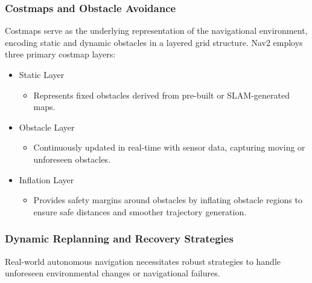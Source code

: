 \documentclass[english,project]{buwthesis}
\begin{document}
\subsubsection{Costmaps and Obstacle Avoidance}
Costmaps serve as the underlying representation of the navigational environment, encoding static and dynamic obstacles in a layered grid structure. Nav2 employs three primary costmap layers:
\begin{itemize}
    \item Static Layer
    \begin{itemize}
        \item Represents fixed obstacles derived from pre-built or SLAM-generated maps.
    \end{itemize}

    \item Obstacle Layer
    \begin{itemize}
        \item Continuously updated in real-time with sensor data, capturing moving or unforeseen obstacles.
    \end{itemize}

    \item Inflation Layer
    \begin{itemize}
        \item Provides safety margins around obstacles by inflating obstacle regions to ensure safe distances and smoother trajectory generation.
    \end{itemize}
\end{itemize}

\subsubsection{Dynamic Replanning and Recovery Strategies}

Real-world autonomous navigation necessitates robust strategies to handle unforeseen environmental changes or navigational failures.
\end{document}
